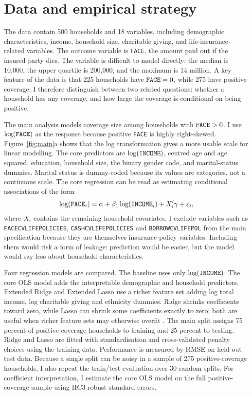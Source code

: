 \documentclass[10pt,a4paper]{article}
\newcommand{\mtt}[1]{\text{\texttt{#1}}}
\begin{document}
\section{Data and empirical strategy}

The data contain 500 households and 18 variables, including demographic characteristics, income, household size, charitable giving, and life-insurance-related variables. The outcome variable is \texttt{FACE}, the amount paid out if the insured party dies. The variable is difficult to model directly: the median is 10,000, the upper quartile is 200,000, and the maximum is 14 million. A key feature of the data is that 225 households have $\mtt{FACE}=0$, while 275 have positive coverage. I therefore distinguish between two related questions: whether a household has any coverage, and how large the coverage is conditional on being positive.

The main analysis models coverage size among households with $\mtt{FACE}>0$. I use $\log(\mtt{FACE})$ as the response because positive \texttt{FACE} is highly right-skewed. Figure~\ref{fig:main}a shows that the log transformation gives a more usable scale for linear modelling. The core predictors are $\log(\mtt{INCOME})$, centred age and age squared, education, household size, the binary gender code, and marital-status dummies. Marital status is dummy-coded because its values are categories, not a continuous scale. The core regression can be read as estimating conditional associations of the form
\[
\log(\mtt{FACE}_i)=\alpha+\beta_1\log(\mtt{INCOME}_i)+X_i'\gamma+\varepsilon_i,
\]
where $X_i$ contains the remaining household covariates. I exclude variables such as \texttt{FACECVLIFEPOLICIES}, \texttt{CASHCVLIFEPOLICIES} and \texttt{BORROWCVLIFEPOL} from the main specification because they are themselves insurance-policy variables. Including them would risk a form of leakage: prediction would be easier, but the model would say less about household characteristics.

Four regression models are compared. The baseline uses only $\log(\mtt{INCOME})$. The core OLS model adds the interpretable demographic and household predictors. Extended Ridge and Extended Lasso use a richer feature set adding log total income, log charitable giving and ethnicity dummies. Ridge shrinks coefficients toward zero, while Lasso can shrink some coefficients exactly to zero; both are useful when richer feature sets may otherwise overfit \citep{hoerlkennard1970,tibshirani1996}. The main split assigns 75 percent of positive-coverage households to training and 25 percent to testing. Ridge and Lasso are fitted with standardisation and cross-validated penalty choices using the training data. Performance is measured by RMSE on held-out test data. Because a single split can be noisy in a sample of 275 positive-coverage households, I also repeat the train/test evaluation over 30 random splits. For coefficient interpretation, I estimate the core OLS model on the full positive-coverage sample using HC3 robust standard errors.
\end{document}
